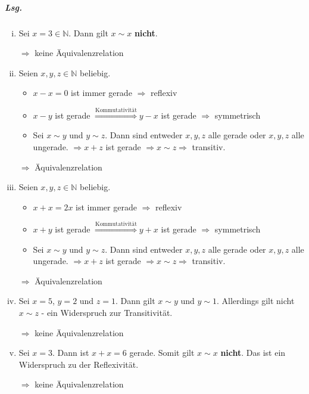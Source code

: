 \documentclass{scrreprt}
\begin{document}
\subparagraph{Lsg.}
\begin{enumerate}[(i)]
\item Sei $x = 3 \in \mathbb{N}$.
  Dann gilt $x \sim x$ \textbf{nicht}.

  $\Rightarrow$ keine Äquivalenzrelation

\item Seien $x, y, z \in \mathbb{N}$ beliebig.
  \begin{itemize}
  \item $x - x = 0$ ist immer gerade $\Rightarrow$ reflexiv
  \item $x - y$ ist gerade $\overset{\text{Kommutativität}}\Rightarrow y - x$
    ist gerade $\Rightarrow$ symmetrisch

  \item Sei $x \sim y$ und $y \sim z$.
    Dann sind entweder $x, y, z$ alle gerade oder $x, y, z$ alle ungerade.
    $\Rightarrow x + z$ ist gerade $\Rightarrow x \sim z \Rightarrow$ transitiv.
  \end{itemize}

  $\Rightarrow$ Äquivalenzrelation

\item Seien $x, y, z \in \mathbb{N}$ beliebig.
  \begin{itemize}
  \item $x + x = 2x$ ist immer gerade $\Rightarrow$ reflexiv
  \item $x + y$ ist gerade $\overset{\text{Kommutativität}}\Rightarrow y + x$
    ist gerade $\Rightarrow$ symmetrisch

  \item Sei $x \sim y$ und $y \sim z$.
    Dann sind entweder $x, y, z$ alle gerade oder $x, y, z$ alle ungerade.
    $\Rightarrow x + z$ ist gerade $\Rightarrow x \sim z \Rightarrow$ transitiv.
  \end{itemize}

  $\Rightarrow$ Äquivalenzrelation

\item Sei $x = 5$, $y = 2$ und $z = 1$.
  Dann gilt $x \sim y$ und $y \sim 1$.
  Allerdings gilt nicht $x \sim z$ - ein Widerspruch zur Transitivität.

  $\Rightarrow$ keine Äquivalenzrelation

\item Sei $x = 3$.
  Dann ist $x + x = 6$ gerade.
  Somit gilt $x \sim x$ \textbf{nicht}.
  Das ist ein Widerspruch zu der Reflexivität.

  $\Rightarrow$ keine Äquivalenzrelation
\end{enumerate}
\end{document}
